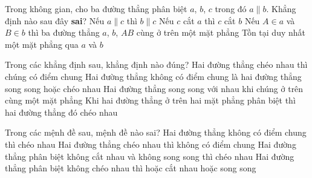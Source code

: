 \begin{ex}%
	Trong không gian, cho ba đường thẳng phân biệt $a$, $b$, $c$ trong  đó $a\parallel b$. Khẳng định nào sau đây \textbf{sai}?
	 \choice
		{Nếu $a\parallel c$ thì $b\parallel c$} 
		{\True Nếu $c$ cắt $a$ thì $c$ cắt  $b$}
		{Nếu $A\in a$ và $B\in b$ thì ba đường thẳng $a$, $b$, $AB$  cùng ở trên một mặt phẳng}
		{Tồn tại  duy nhất một mặt phẳng qua $a$ và $b$}
\end{ex}

\begin{ex}%
	Trong các khẳng định sau,  khẳng định nào đúng?
	 \choice
		{Hai  đường thẳng chéo nhau thì chúng có điểm chung}
		{\True Hai đường thẳng không có điểm  chung là hai đường thẳng song song hoặc chéo nhau}
		{Hai đường thẳng song song với nhau khi chúng ở trên cùng một mặt phẳng} 
		{Khi hai đường thẳng ở trên hai mặt phẳng phân biệt thì hai  đường thẳng đó chéo nhau}
\end{ex}

\begin{ex}%
	 Trong các mệnh đề sau, mệnh đề nào sai?
	 \choice
		{\True Hai đường thẳng không  có điểm chung thì chéo nhau}
		{Hai đường  thẳng chéo nhau thì không có điểm chung}
		{Hai đường thẳng phân biệt không cắt nhau và không song  song thì chéo nhau}
		{Hai đường thẳng phân biệt không chéo nhau thì  hoặc cắt nhau hoặc song song}
\end{ex}

